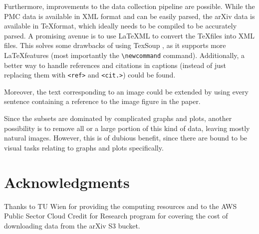 Furthermore, improvements to the data collection pipeline are possible. While the PMC data is available in XML format and can be easily parsed, the arXiv data is available in \TeX format, which ideally needs to be compiled to be accurately parsed. A promising avenue is to use LaTeXML to convert the \TeX files into XML files. This solves some drawbacks of using TexSoup \cite{TexSoup}, as it supports more \LaTeX features (most importantly the \verb.\newcommand. command). Additionally, a better way to handle references and citations in captions (instead of just replacing them with \verb|<ref>| and \verb|<cit.>|) could be found.

Moreover, the text corresponding to an image could be extended by using every sentence containing a reference to the image figure in the paper.

Since the subsets are dominated by complicated graphs and plots, another possibility is to remove all or a large portion of this kind of data, leaving mostly natural images. However, this is of dubious benefit, since there are bound to be visual tasks relating to graphs and plots specifically.

\section{Acknowledgments}
Thanks to TU Wien for providing the computing resources and to the AWS Public Sector Cloud Credit for Research program for covering the cost of downloading data from the arXiv S3 bucket.